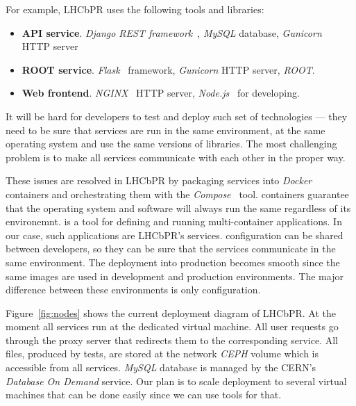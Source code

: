 \documentclass[10pt]{iopart}
\begin{document}
For example, LHCbPR uses the following tools and libraries:
\begin{itemize}
\item \textbf{API service}. \textit{Django REST framework}~\cite{rest}, \textit{MySQL}
database, \textit{Gunicorn}~\cite{gunicorn} HTTP server
\item \textbf{ROOT service}. \textit{Flask}~\cite{flask} framework, \textit{Gunicorn} HTTP server, \textit{ROOT}.
\item \textbf{Web frontend}. \textit{NGINX}~\cite{nginx} HTTP server, \textit{Node.js}~\cite{node} for developing.
\end{itemize}

It will be hard for developers to test and deploy  such set of technologies
--- they need to be sure that services are run in the same environment, at
the same operating system and use the same versions of libraries. The most
challenging problem is to make all services communicate with each other in the proper way.

These issues are resolved in LHCbPR by packaging services into
\textit{Docker~\cite{docker}} containers and orchestrating them with the \docker
\textit{Compose~\cite{compose}} tool. \docker containers guarantee that the
operating system and software will always run the same regardless of its
environemnt. \compose is a tool for defining and running multi-container \docker
applications. In our case, such applications are LHCbPR's services. \composes
configuration can be shared between developers, so they can be sure that the
services communicate in the same environment. The deployment into production
becomes  smooth since the same
\docker images are used in development and production environments. The major difference
 between these environments is only \composes configuration.

Figure~\ref{fig:nodes} shows the current deployment diagram of LHCbPR. At the
moment all services run at the dedicated virtual machine. All user requests go
through the proxy server that redirects them to the corresponding service. All
files, produced by tests, are stored at the network \textit{CEPH} volume which
is accessible from all services.
\textit{MySQL} database is managed by the CERN's \textit{Database On Demand}
service. Our plan is  to scale deployment to several virtual machines that can
be done easily since we can use \docker tools for that.  
\end{document}
